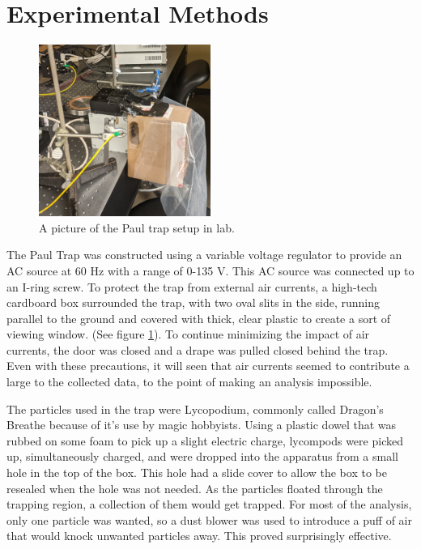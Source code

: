 \documentclass[12pt]{article}
\begin{document}

\section{Experimental Methods}
\begin{figure}[ht]
\centering
    \includegraphics[width=0.5\textwidth]{paul_trap.jpg}
	\caption{A picture of the Paul trap setup in lab.}
    \label{fig:paul_trap}
\end{figure}

The Paul Trap was constructed using a variable voltage regulator to provide an AC source at 60 Hz with a range of 0-135 V. This AC source was connected up to an I-ring screw. To protect the trap from external air currents, a high-tech cardboard box surrounded the trap, with two oval slits in the side, running parallel to the ground and covered with thick, clear plastic to create a sort of viewing window. (See figure \ref{fig:paul_trap}). To continue minimizing the impact of air currents, the door was closed and a drape was pulled closed behind the trap. Even with these precautions, it will seen that air currents seemed to contribute a large to the collected data, to the point of making an analysis impossible. 

The particles used in the trap were Lycopodium, commonly called Dragon's Breathe because of it's use by magic hobbyists. Using a plastic dowel that was rubbed on some foam to pick up a slight electric charge, lycompods were picked up, simultaneously charged, and were dropped into the apparatus from a small hole in the top of the box. This hole had a slide cover to allow the box to be resealed when the hole was not needed. As the particles floated through the trapping region, a collection of them would get trapped. For most of the analysis, only one particle was wanted, so a dust blower was used to introduce a puff of air that would knock unwanted particles away. This proved surprisingly effective. 
\end{document}
